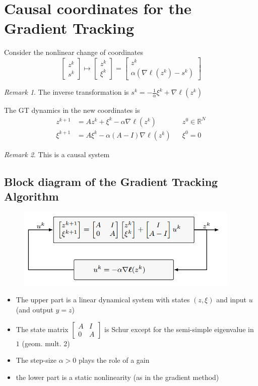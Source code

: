 \documentclass{book}
\newcommand{\R}{\mathbb{R}}
\theoremstyle{theoremv2}
\theoremstyle{defv2}
\theoremstyle{remark}
\newtheorem*{remark}{Remark}
\theoremstyle{remark}
\theoremstyle{definition}
\theoremstyle{definition}
\begin{document}
\section{Causal coordinates for the Gradient Tracking}
Consider the nonlinear change of coordinates 
\[
    \begin{bmatrix}
        z^k \\ s^k
    \end{bmatrix} \mapsto \begin{bmatrix}
        z^k \\ \xi^k
    \end{bmatrix} = \begin{bmatrix}
        z^k \\ \alpha(\nabla\boldsymbol{\ell}(z^k)-s^k)
    \end{bmatrix}
\]
\begin{remark}
    The inverse transformation is $s^k = -\frac{1}{\alpha}\xi^k + \nabla \boldsymbol{\ell}(z^k)$
\end{remark}
The GT dynamics in the new coordinates is 
\begin{align*}
    z^{k+1} &= Az^k + \xi^k - \alpha\nabla\boldsymbol{\ell}(z^k) && z^0\in\R^N\\
    \xi^{k+1} &= A\xi^k - \alpha(A-I)\nabla\boldsymbol{\ell}(z^k) && \xi^0 = 0
\end{align*}
\begin{remark}
    This is a causal system
\end{remark}

\subsection{Block diagram of the Gradient Tracking Algorithm}
\begin{figure}[H]
    \begin{center}
        \includegraphics[width=0.95\textwidth]{figures/gradtrack}
    \end{center}
\end{figure}
\begin{itemize}
    \item The upper part is a linear dynamical system with states $(z,\xi)$ and input $u$ (and output $y=z$)
    \item The state matrix $\begin{bmatrix}
            A & I \\ 0 & A
    \end{bmatrix}$ is Schur except for the semi-simple eigenvalue in $1$ (geom. mult. 2)
    \item The step-size $\alpha>0$ plays the role of a gain
    \item the lower part is a static nonlinearity (as in the gradient method)
\end{itemize}
\end{document}
